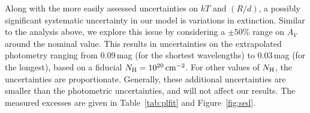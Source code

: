 \documentclass[iop]{emulateapj}
\begin{document}
Along with the more easily assessed uncertainties on $kT$ and $(R/d)$,
a possibly significant systematic uncertainty in our model is
variations in extinction.  Similar to the analysis above, we explore
this issue by considering a $\pm 50$\% range on $A_V$ around the
nominal value.  This results in uncertainties on the extrapolated
photometry ranging from 0.09\,mag (for the shortest wavelengths) to
0.03\,mag (for the longest), based on a fiducial $N_{\rm
  H}=10^{20}\,{\rm cm}^{-2}$.  For other values of $N_{\rm H}$, the
uncertainties are proportionate.  Generally, these additional
uncertainties are smaller than the photometric uncertainties, and will
not affect our results.  The measured excesses are given in
Table~\ref{tab:plfit} and Figure~\ref{fig:sed}.

\end{document}

